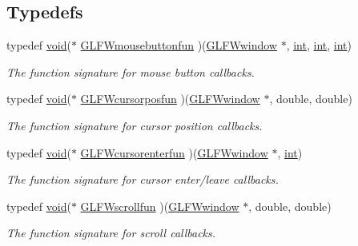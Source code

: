 \subsection*{Typedefs}
\begin{DoxyCompactItemize}
\item 
typedef \hyperlink{wglew_8h_aeea6e3dfae3acf232096f57d2d57f084}{void}($\ast$ \hyperlink{group__input_ga1e008c7a8751cea648c8f42cc91104cf}{G\-L\-F\-Wmousebuttonfun} )(\hyperlink{group__window_ga3c96d80d363e67d13a41b5d1821f3242}{G\-L\-F\-Wwindow} $\ast$, \hyperlink{wglew_8h_a500a82aecba06f4550f6849b8099ca21}{int}, \hyperlink{wglew_8h_a500a82aecba06f4550f6849b8099ca21}{int}, \hyperlink{wglew_8h_a500a82aecba06f4550f6849b8099ca21}{int})
\begin{DoxyCompactList}\small\item\em The function signature for mouse button callbacks. \end{DoxyCompactList}\item 
typedef \hyperlink{wglew_8h_aeea6e3dfae3acf232096f57d2d57f084}{void}($\ast$ \hyperlink{group__input_ga592fbfef76d88f027cb1bc4c36ebd437}{G\-L\-F\-Wcursorposfun} )(\hyperlink{group__window_ga3c96d80d363e67d13a41b5d1821f3242}{G\-L\-F\-Wwindow} $\ast$, double, double)
\begin{DoxyCompactList}\small\item\em The function signature for cursor position callbacks. \end{DoxyCompactList}\item 
typedef \hyperlink{wglew_8h_aeea6e3dfae3acf232096f57d2d57f084}{void}($\ast$ \hyperlink{group__input_ga762d898d9b0241d7e3e3b767c6cf318f}{G\-L\-F\-Wcursorenterfun} )(\hyperlink{group__window_ga3c96d80d363e67d13a41b5d1821f3242}{G\-L\-F\-Wwindow} $\ast$, \hyperlink{wglew_8h_a500a82aecba06f4550f6849b8099ca21}{int})
\begin{DoxyCompactList}\small\item\em The function signature for cursor enter/leave callbacks. \end{DoxyCompactList}\item 
typedef \hyperlink{wglew_8h_aeea6e3dfae3acf232096f57d2d57f084}{void}($\ast$ \hyperlink{group__input_ga6228cdf94d28fbd3a9a1fbb0e5922a8a}{G\-L\-F\-Wscrollfun} )(\hyperlink{group__window_ga3c96d80d363e67d13a41b5d1821f3242}{G\-L\-F\-Wwindow} $\ast$, double, double)
\begin{DoxyCompactList}\small\item\em The function signature for scroll callbacks. \end{DoxyCompactList}\item 

\end{DoxyCompactItemize}
